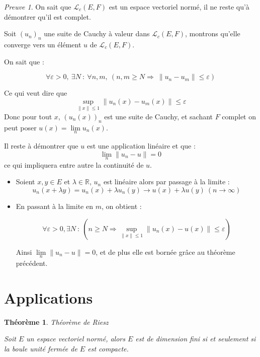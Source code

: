 \documentclass[]{article}
\newtheorem{mythm}{Théorème}
\theoremstyle{remark}
\newtheorem{myproof}{Preuve}
\theoremstyle{definition}
\begin{document}
\begin{myproof}
	On sait que $\mathcal{L}_c(E, F)$ est un espace vectoriel normé, il ne reste qu'à démontrer qu'il est complet.
	
	Soit $(u_n)_n$ une suite de Cauchy à valeur dans $\mathcal{L}_c(E, F)$, montrons qu'elle converge vers un élément $u$ de $\mathcal{L}_c(E, F)$.
	
	On sait que :
	
	$$\forall \varepsilon > 0, ~ \exists N ~ : ~ \forall n,m, ~ (n,m \geqslant N \Longrightarrow ~ \|u_n - u_m\| \leqslant \varepsilon)$$
	
	Ce qui veut dire que $$\sup_{\|x\| \leqslant 1} \|u_n(x) - u_m(x)\| \leqslant \varepsilon$$ Donc pour tout $x$, $(u_n(x))_n$ est une suite de Cauchy, et sachant $F$ complet on peut poser $u(x)=\lim\limits_{n} u_n (x)$.
	
	Il reste à démontrer que $u$ est une application linéaire et que : $$\lim\limits_{n} \|u_n - u\| = 0$$
	ce qui impliquera entre autre la continuité de $u$.
	
	\begin{itemize}
		\item Soient $x, y \in E$ et $\lambda \in \mathbb{R}$, $u_n$ est linéaire alors par passage à la limite :
		$$u_n(x+\lambda y) = u_n(x) + \lambda u_n(y) \longrightarrow u(x) + \lambda u(y) ~ (n \rightarrow \infty)$$
		
		\item En passant à la limite en $m$, on obtient :
		
		$$\forall \varepsilon > 0, \exists N ~ : ~ (n \geqslant N \Longrightarrow \sup_{\|x\| \leqslant 1}\|u_n(x)-u(x)\| \leqslant \varepsilon)$$
		
		Ainsi $\lim\limits_{n} \|u_n - u\| = 0$, et de plus elle est bornée grâce au théorème précédent.
	\end{itemize}
\end{myproof}

\section{Applications}

\begin{mythm} Théorème de Riesz
	
	Soit $E$ un espace vectoriel normé, alors $E$ est de dimension fini si et seulement si la boule unité fermée de $E$ est compacte.
\end{mythm}
\end{document}
